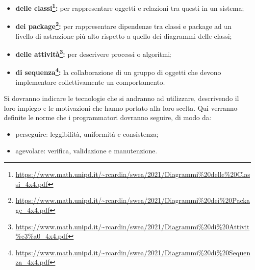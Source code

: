                 \begin{itemize}
                    \item \textbf{delle classi\footnote{\url{https://www.math.unipd.it/~rcardin/swea/2021/Diagrammi\%20delle\%20Classi_4x4.pdf}}: }per rappresentare oggetti e relazioni tra questi in un sistema;
                    \item \textbf{dei package\footnote{\url{https://www.math.unipd.it/~rcardin/swea/2021/Diagrammi\%20dei\%20Package_4x4.pdf}}: }per rappresentare dipendenze tra classi e package ad un livello di astrazione più alto rispetto a quello dei diagrammi delle classi;
                        \item \textbf{delle attività\footnote{\url{https://www.math.unipd.it/~rcardin/swea/2021/Diagrammi\%20di\%20Attivit\%c3\%a0_4x4.pdf}}: }per descrivere processi o algoritmi;
                    \item \textbf{di sequenza\footnote{\url{https://www.math.unipd.it/~rcardin/swea/2021/Diagrammi\%20di\%20Sequenza_4x4.pdf}}: }la collaborazione di un gruppo di oggetti che devono implementare collettivamente un comportamento.
                \end{itemize}
                Si dovranno indicare le tecnologie che si andranno ad utilizzare, descrivendo il loro impiego e le motivazioni che hanno portato alla loro scelta.
            Qui verranno definite le norme che i programmatori dovranno seguire, di modo da:
             \begin{itemize}
                 \item perseguire: leggibilità, uniformità e consistenza;
                 \item agevolare: verifica, validazione e manutenzione.
             \end{itemize}

